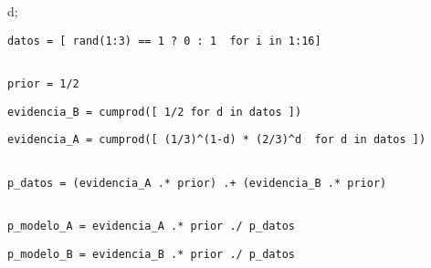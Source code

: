 \documentclass[shownotes,aspectratio=169]{beamer}
\begin{document}
\begin{frame}[plain]
\begin{textblock}{80}
{     {d};
}

\vspace{0.75cm}
\end{textblock}

\end{frame}

\begin{frame}

\begin{lstlisting}[belowskip=-0.6 \baselineskip]
datos = [ rand(1:3) == 1 ? 0 : 1  for i in 1:16]
\end{lstlisting}
\pause
\begin{lstlisting}[belowskip=-0.6 \baselineskip]

prior = 1/2
\end{lstlisting}
\pause
\begin{lstlisting}[belowskip=-0.6 \baselineskip]
evidencia_B = cumprod([ 1/2 for d in datos ])
\end{lstlisting}
\pause
\begin{lstlisting}[belowskip=-0.6 \baselineskip]
evidencia_A = cumprod([ (1/3)^(1-d) * (2/3)^d  for d in datos ])
\end{lstlisting}
\pause
\begin{lstlisting}[belowskip=-0.6 \baselineskip]

p_datos = (evidencia_A .* prior) .+ (evidencia_B .* prior)
\end{lstlisting}
\pause
\begin{lstlisting}[belowskip=-0.6 \baselineskip]

p_modelo_A = evidencia_A .* prior ./ p_datos
\end{lstlisting}
\pause
\begin{lstlisting}
p_modelo_B = evidencia_B .* prior ./ p_datos
\end{lstlisting}
\end{frame}
\end{document}
